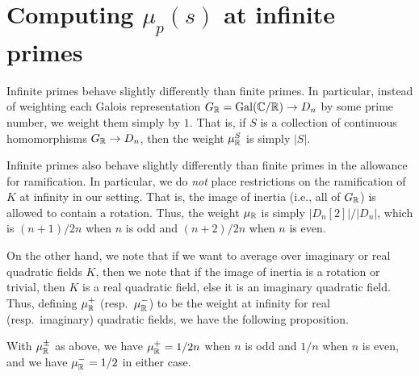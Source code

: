\section{Computing $\mu_p(s)$ at infinite primes}\label{sec:infiniteprimes}

Infinite primes behave slightly differently than finite primes. In particular,
instead of weighting each Galois representation $G_{\mathbb{R}} = \operatorname{Gal}(\mathbb{C}/\mathbb{R}) \to D_n$ by
some prime number, we weight them simply by $1$. That is, if $S$ is a
collection of continuous homomorphisms $G_{\mathbb{R}} \to D_n$, then the weight
$\mu_{\mathbb{R}}^S$ is simply $|S|$.

Infinite primes also behave slightly differently than finite primes in the
allowance for ramification. In particular, we do {\em not} place restrictions
on the ramification of $K$ at infinity in our setting. That is, the image of
inertia (i.e., all of $G_{\mathbb{R}}$) is allowed to contain a rotation. Thus, the
weight $\mu_{\mathbb{R}}$ is simply $|D_n[2]|/|D_n|$, which is $(n+1)/2n$ when $n$ is odd
and $(n+2)/2n$ when $n$ is even.

On the other hand, we note that if we want to average over imaginary or real
quadratic fields $K$, then we note that if the image of inertia is a rotation
or trivial, then $K$ is a real quadratic field, else it is an imaginary
quadratic field. Thus, defining $\mu_{\mathbb{R}}^+$ (resp.~$\mu_{\mathbb{R}}^-$) to be the weight
at infinity for real (resp.~imaginary) quadratic fields, we have the following proposition.

\begin{prop}\label{prop:infiniteprimes}
  With $\mu_{\mathbb{R}}^\pm$ as above, we have $\mu_{\mathbb{R}}^+ = 1/2n$ when $n$ is odd and
$1/n$ when $n$ is even, and we have $\mu_{\mathbb{R}}^- = 1/2$ in either case.
\end{prop}
